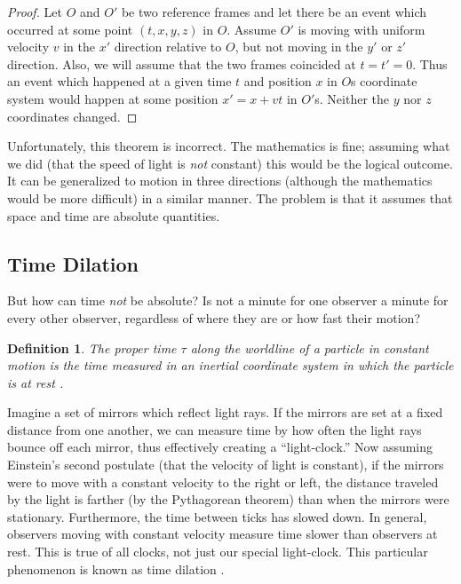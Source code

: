 \documentclass[12pt]{article}
\theoremstyle{defn}
\newtheorem{defn}{Definition}
\theoremstyle{pf}
\newcommand{\0}{\emptyset}
\renewcommand{\-}{\setminus}
\begin{document}
\begin{proof}
 Let $O$ and $O'$ be two reference frames and let there be an event which occurred at some point $(t,x,y,z)$ in $O$. Assume $O'$ is moving with uniform velocity $v$ in the $x'$ direction relative to $O$, but not moving in the $y'$ or $z'$ direction. Also, we will assume that the two frames coincided at $t=t'=0$. Thus an event which happened at a given time $t$ and position $x$ in $O$s coordinate system would happen at some position $x'=x+vt$ in $O'$s. Neither the $y$ nor $z$ coordinates changed.
\end{proof}

Unfortunately, this theorem is incorrect. The mathematics is fine; assuming what we did (that the speed of light is \textit{not} constant) this would be the logical outcome. It can be generalized to motion in three directions (although the mathematics would be more difficult) in a similar manner. The problem is that it assumes that space and time are absolute quantities.

\subsection{Time Dilation}
But how can time \textit{not} be absolute? Is not a minute for one observer a minute for every other observer, regardless of where they are or how fast their motion? 

\begin{defn}The \textit{proper time} $\tau$ along the worldline of a particle in constant motion is the time measured in an inertial coordinate system in which the particle is at rest \cite{woodhouse}.
\end{defn}

Imagine a set of mirrors which reflect light rays. If the mirrors are set at a fixed distance from one another, we can measure time by how often the light rays bounce off each mirror, thus effectively creating a ``light-clock.'' Now assuming Einstein's second postulate (that the velocity of light is constant), if the mirrors were to move with a constant velocity to the right or left, the distance traveled by the light is farther (by the Pythagorean theorem) than when the mirrors were stationary. Furthermore, the time between ticks has slowed down. In general, observers moving with constant velocity measure time slower than observers at rest. This is true of all clocks, not just our special light-clock. This particular phenomenon is known as time dilation \cite{vanname_flory}.
\end{document}
